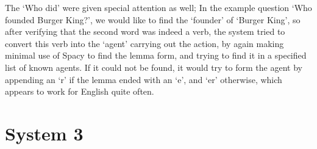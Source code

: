 \documentclass{article}
\begin{document}
The `Who did' were given special attention as well; In the example question `Who founded Burger King?', we would like to find the `founder' of `Burger King', so after verifying that the second word was indeed a verb, the system tried to convert this verb into the `agent' carrying out the action, by again making minimal use of Spacy to find the lemma form, and trying to find it in a specified list of known agents. If it could not be found, it would try to form the agent by appending an `r' if the lemma ended with an `e', and `er' otherwise, which appears to work for English quite often.\\

\section*{System 3}
\end{document}
